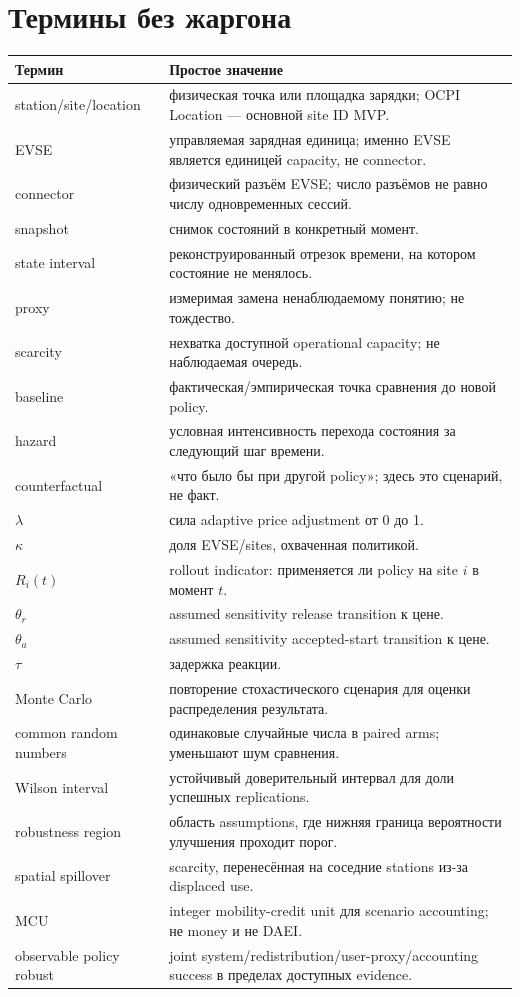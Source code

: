 \documentclass[11pt,a4paper]{article}
\begin{document}
\section{Термины без жаргона}
\begin{longtable}{p{3.5cm}p{12.5cm}}
\toprule Термин & Простое значение \\\midrule\endhead
station/site/location & физическая точка или площадка зарядки; OCPI Location --- основной site ID MVP.\\
EVSE & управляемая зарядная единица; именно EVSE является единицей capacity, не connector.\\
connector & физический разъём EVSE; число разъёмов не равно числу одновременных сессий.\\
snapshot & снимок состояний в конкретный момент.\\
state interval & реконструированный отрезок времени, на котором состояние не менялось.\\
proxy & измеримая замена ненаблюдаемому понятию; не тождество.\\
scarcity & нехватка доступной operational capacity; не наблюдаемая очередь.\\
baseline & фактическая/эмпирическая точка сравнения до новой policy.\\
hazard & условная интенсивность перехода состояния за следующий шаг времени.\\
counterfactual & «что было бы при другой policy»; здесь это сценарий, не факт.\\
$\lambda$ & сила adaptive price adjustment от 0 до 1.\\
$\kappa$ & доля EVSE/sites, охваченная политикой.\\
$R_i(t)$ & rollout indicator: применяется ли policy на site $i$ в момент $t$.\\
$\theta_r$ & assumed sensitivity release transition к цене.\\
$\theta_a$ & assumed sensitivity accepted-start transition к цене.\\
$\tau$ & задержка реакции.\\
Monte Carlo & повторение стохастического сценария для оценки распределения результата.\\
common random numbers & одинаковые случайные числа в paired arms; уменьшают шум сравнения.\\
Wilson interval & устойчивый доверительный интервал для доли успешных replications.\\
robustness region & область assumptions, где нижняя граница вероятности улучшения проходит порог.\\
spatial spillover & scarcity, перенесённая на соседние stations из-за displaced use.\\
MCU & integer mobility-credit unit для scenario accounting; не money и не DAEI.\\
observable policy robust & joint system/redistribution/user-proxy/accounting success в пределах доступных evidence.\\
\bottomrule
\end{longtable}
\end{document}
